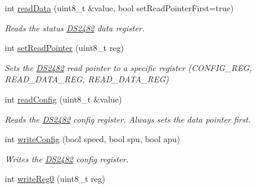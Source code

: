 \begin{DoxyCompactItemize}
\mbox{\label{class_d_s2482_command_a4cefdb82733790a811dced1de08d6651}} 
int \mbox{\hyperlink{class_d_s2482_command_a4cefdb82733790a811dced1de08d6651}{read\+Data}} (uint8\+\_\+t \&value, bool set\+Read\+Pointer\+First=true)
\begin{DoxyCompactList}\small\item\em Reads the status \mbox{\hyperlink{class_d_s2482}{D\+S2482}} data register. \end{DoxyCompactList}\item 
\mbox{\label{class_d_s2482_command_a5923ef4a995083ecd35a0f3428aad2c9}} 
int \mbox{\hyperlink{class_d_s2482_command_a5923ef4a995083ecd35a0f3428aad2c9}{set\+Read\+Pointer}} (uint8\+\_\+t reg)
\begin{DoxyCompactList}\small\item\em Sets the \mbox{\hyperlink{class_d_s2482}{D\+S2482}} read pointer to a specific register (C\+O\+N\+F\+I\+G\+\_\+\+R\+EG, R\+E\+A\+D\+\_\+\+D\+A\+T\+A\+\_\+\+R\+EG, R\+E\+A\+D\+\_\+\+D\+A\+T\+A\+\_\+\+R\+EG) \end{DoxyCompactList}\item 
\mbox{\label{class_d_s2482_command_a821fd22a641c45c97f97f5c8884de0bb}} 
int \mbox{\hyperlink{class_d_s2482_command_a821fd22a641c45c97f97f5c8884de0bb}{read\+Config}} (uint8\+\_\+t \&value)
\begin{DoxyCompactList}\small\item\em Reads the \mbox{\hyperlink{class_d_s2482}{D\+S2482}} config register. Always sets the data pointer first. \end{DoxyCompactList}\item 
\mbox{\label{class_d_s2482_command_a22dbc965ff38e12e2535c882c36ef32c}} 
int \mbox{\hyperlink{class_d_s2482_command_a22dbc965ff38e12e2535c882c36ef32c}{write\+Config}} (bool speed, bool spu, bool apu)
\begin{DoxyCompactList}\small\item\em Writes the \mbox{\hyperlink{class_d_s2482}{D\+S2482}} config register. \end{DoxyCompactList}\item 
\mbox{\label{class_d_s2482_command_acc17deae69011d477cbc1256a33cbe0a}} 
int \mbox{\hyperlink{class_d_s2482_command_acc17deae69011d477cbc1256a33cbe0a}{write\+Reg0}} (uint8\+\_\+t reg)

\end{DoxyCompactItemize}

